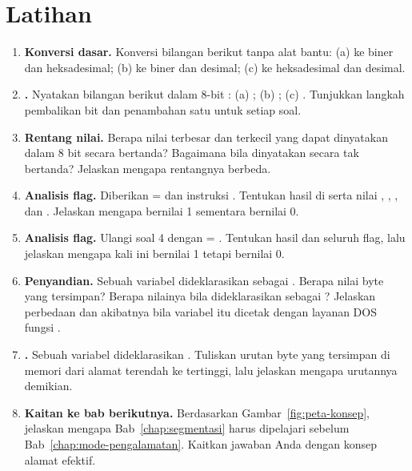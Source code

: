 \section{Latihan}
\label{sec:latihan-bab2}

\begin{enumerate}
    \item \textbf{Konversi dasar.} Konversi bilangan berikut tanpa
          alat bantu: (a)  ke biner dan heksadesimal;
          (b)  ke biner dan desimal; (c)  ke
          heksadesimal dan desimal.

    \item \textbf{.} Nyatakan bilangan berikut
          dalam 8-bit : (a) ;
          (b) ; (c) . Tunjukkan langkah pembalikan
          bit dan penambahan satu untuk setiap soal.

    \item \textbf{Rentang nilai.} Berapa nilai terbesar dan terkecil
          yang dapat dinyatakan dalam 8 bit secara bertanda? Bagaimana
          bila dinyatakan secara tak bertanda? Jelaskan mengapa
          rentangnya berbeda.

    \item \textbf{Analisis flag.} Diberikan  =  dan
          instruksi . Tentukan hasil di 
          serta nilai , , , dan
          . Jelaskan mengapa  bernilai 1 sementara
           bernilai 0.

    \item \textbf{Analisis flag.} Ulangi soal 4 dengan  =
          . Tentukan hasil dan seluruh flag, lalu jelaskan
          mengapa kali ini  bernilai 1 tetapi 
          bernilai 0.

    \item \textbf{Penyandian.} Sebuah variabel dideklarasikan sebagai
          . Berapa nilai byte yang tersimpan? Berapa
          nilainya bila dideklarasikan sebagai ? Jelaskan
          perbedaan dan akibatnya bila variabel itu dicetak dengan
          layanan DOS fungsi .

    \item \textbf{.} Sebuah variabel
          dideklarasikan . Tuliskan urutan byte yang
          tersimpan di memori dari alamat terendah ke tertinggi, lalu
          jelaskan mengapa urutannya demikian.

    \item \textbf{Kaitan ke bab berikutnya.} Berdasarkan
          Gambar~\ref{fig:peta-konsep}, jelaskan mengapa
          Bab~\ref{chap:segmentasi} harus dipelajari sebelum
          Bab~\ref{chap:mode-pengalamatan}. Kaitkan jawaban Anda
          dengan konsep alamat efektif.
\end{enumerate}

